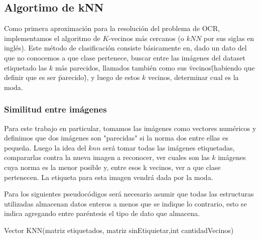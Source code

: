 \subsection{Algortimo de kNN}
Como primera aproximación para la resolución del problema de OCR, implementamos el algoritmo de $K$-vecinos más cercanos (o $kNN$ por sus siglas en inglés). Este método de clasificación consiste básicamente en, dado un dato del que no conocemos a que clase pertenece, buscar entre las imágenes del dataset etiquetado las $k$ más parecidos, llamados también como sus \"vecinos\" (habiendo que definir que es ser \"parecido\"), y luego de estos $k$ vecinos, determinar cual es la moda. 
\\
\subsubsection{Similitud entre imágenes}
Para este trabajo en particular, tomamos las imágenes como vectores numéricos y definimos que dos imágenes son "parecidas" si la norma dos entre ellas es pequeña. Luego la idea del $knn$ será tomar todas las imágenes etiquetadas, compararlas contra la nueva imagen a reconocer, ver cuales son las $k$ imágenes cuya norma es la menor posible y, entre esos k vecinos, ver a que clase pertenecen. La etiqueta para esta imagen vendrá dada por la moda. 

Para los siguientes pseudocódigos será necesario asumir que todas las estructuras utilizadas almacenan datos enteros a menos que se indique lo contrario, esto se indica agregando entre paréntesis el tipo de dato que almacena.
\\
\begin{algorithm}
\begin{algorithmic}[1]\parskip=1mm
\caption{Vector KNN(matriz etiquetados, matriz sinEtiquietar,int cantidadVecinos)}
\ENDFOR
{}
\end{algorithmic}
\end{algorithm}

